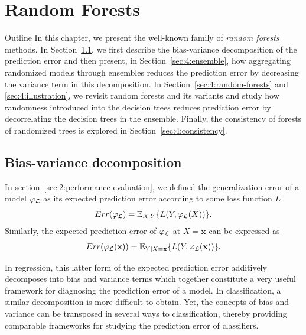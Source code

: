 \chapter{Random Forests}\label{ch:forest}

\begin{remark}{Outline}
In this chapter, we present the well-known family of \textit{random forests}
methods. In Section~\ref{sec:4:bias-variance}, we first describe the bias-variance
decomposition of the prediction error and then present, in
Section~\ref{sec:4:ensemble}, how aggregating randomized models through
ensembles reduces the prediction error by decreasing the variance term in this
decomposition. In Section~\ref{sec:4:random-forests} and \ref{sec:4:illustration}, we revisit random forests
and its variants and study how randomness introduced into the decision trees
reduces prediction error by decorrelating the decision
trees in the ensemble. Finally, the consistency of forests of randomized trees
is explored in Section~\ref{sec:4:consistency}.
\end{remark}


\section{Bias-variance decomposition}
\label{sec:4:bias-variance}

In section~\ref{sec:2:performance-evaluation}, we defined the generalization
error of a model $\varphi_{\cal L}$ as its expected prediction error
according to some loss function $L$
\begin{equation}
Err(\varphi_{\cal L}) = \mathbb{E}_{X,Y} \{ L(Y, \varphi_{\cal L}(X)) \}.
\end{equation}
Similarly, the expected prediction error of $\varphi_{\cal L}$ at $X=\mathbf{x}$
can be expressed as
\begin{equation}
Err(\varphi_{\cal L}(\mathbf{x})) = \mathbb{E}_{Y|X=\mathbf{x}} \{ L(Y, \varphi_{\cal L}(\mathbf{x})) \}.\label{eqn:4:generalization-error:x}
\end{equation}

In regression, this latter form of the expected prediction error additively
decomposes into bias and variance terms which together constitute a very useful
framework for diagnosing the prediction error of a model. In classification, a
similar decomposition is more difficult to obtain. Yet, the
concepts of bias and variance can be transposed in several ways to
classification, thereby providing comparable frameworks for studying the
prediction error of classifiers.


